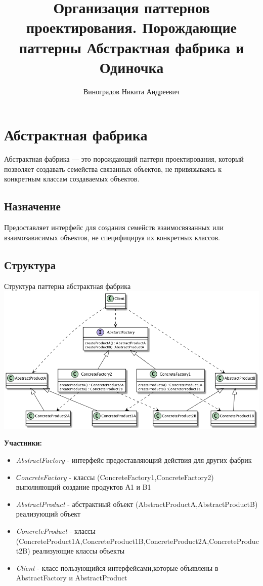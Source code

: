 \documentclass[PI,LAB]{HSEUniversity}
\title{Организация паттернов проектирования. Порождающие паттерны Абстрактная фабрика и Одиночка }
\author{Виноградов Никита Андреевич}
\begin{document}
\maketitle



\chapter{Абстрактная фабрика}
Абстрактная фабрика — это порождающий паттерн проектирования, который позволяет создавать семейства связанных объектов, не привязываясь к конкретным классам создаваемых объектов.
\section{Назначение}
Предоставляет интерфейс для создания семейств взаимосвязанных или взаимозависимых объектов, не специфицируя их конкретных классов. 
\section{Структура}

\begin{FIGURE}[h]{Структура паттерна абстрактная фабрика\label{fig:example-figure}}
	\includegraphics[width=\textwidth]{../out/diagrams/factory/flex}
\end{FIGURE}

\textbf{Участники:}
\begin{itemize}
	\item \emph{AbstractFactory} - интерфейс предоставляющий действия для других фабрик
	\item \emph{СoncreteFactory} - классы (ConcreteFactory1,ConcreteFactory2) выполняющий создание продуктов А1 и B1
	\item \emph{AbstractProduct} - абстрактный объект (AbstractProductA,AbstractProductB) реализующий объект
	\item \emph{ConcreteProduct} - классы (ConcreteProduct1A,ConcreteProduct1B,ConcreteProduct2A,ConcreteProduct2B)  реализующие классы объекты
	\item \emph{Client} - класс пользующийся интерфейсами,которые объявлены в AbstractFactory и AbstractProduct
\end{itemize}
\end{document}

